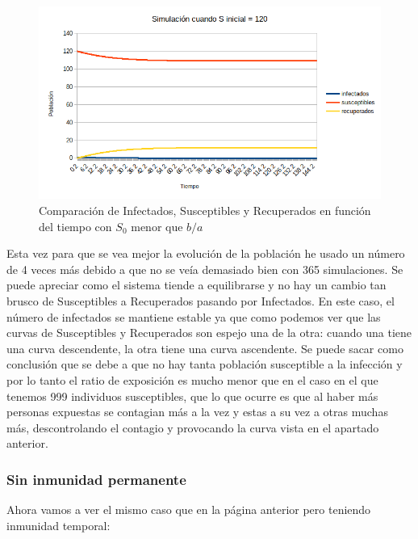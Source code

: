\documentclass[11pt,a4paper]{report}
\begin{document}
\begin{figure}[H]
\centering
\includegraphics[width=\textwidth]{img/inmunidad/simulacion_ba_menor.png}
\caption{Comparación de Infectados, Susceptibles y Recuperados en función del tiempo con $S_0$ menor que $b/a$}
\label{}
\end{figure}

Esta vez para que se vea mejor la evolución de la población he usado un número de 4 veces más debido a que no se veía demasiado bien con 365 simulaciones. Se puede apreciar como el sistema tiende a equilibrarse y no hay un cambio tan brusco de Susceptibles a Recuperados pasando por Infectados. En este caso, el número de infectados se mantiene estable ya que como podemos ver que las curvas de Susceptibles y Recuperados son espejo una de la otra: cuando una tiene una curva descendente, la otra tiene una curva ascendente. Se puede sacar como conclusión que se debe a que no hay tanta población susceptible a la infección y por lo tanto el ratio de exposición es mucho menor que en el caso en el que tenemos 999 individuos susceptibles, que lo que ocurre es que al haber más personas expuestas se contagian más a la vez y estas a su vez a otras muchas más, descontrolando el contagio y provocando la curva vista en el apartado anterior.

\newpage
\subsubsection{Sin inmunidad permanente}
Ahora vamos a ver el mismo caso que en la página anterior pero teniendo inmunidad temporal:
\end{document}
